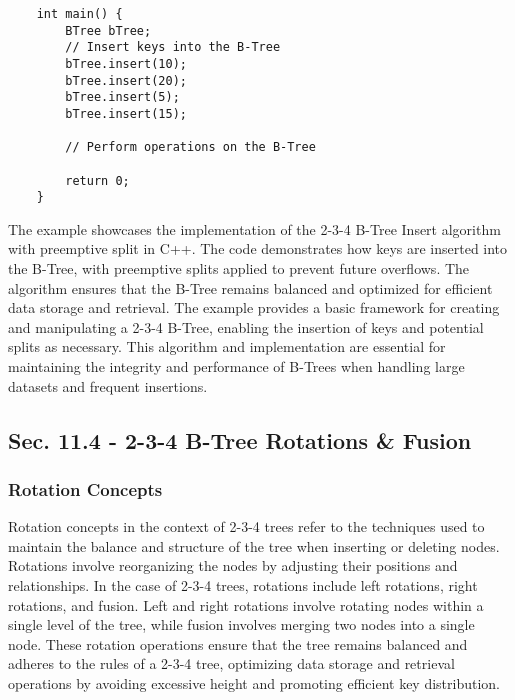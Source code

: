 \begin{solution}
\begin{verbatim}
    int main() {
        BTree bTree;
        // Insert keys into the B-Tree
        bTree.insert(10);
        bTree.insert(20);
        bTree.insert(5);
        bTree.insert(15);
        
        // Perform operations on the B-Tree
    
        return 0;
    }
    \end{verbatim}

    \horizontalline

    The example showcases the implementation of the 2-3-4 B-Tree Insert algorithm with preemptive split in C++. The code demonstrates how keys are inserted into the B-Tree, with preemptive splits applied to prevent future overflows. The algorithm ensures that the B-Tree remains balanced and optimized for efficient data storage 
    and retrieval. The example provides a basic framework for creating and manipulating a 2-3-4 B-Tree, enabling the insertion of keys and potential splits as necessary. This algorithm and implementation are essential for maintaining the integrity and performance of B-Trees when handling large datasets and frequent insertions.
\end{solution}

\subsection*{Sec. 11.4 - 2-3-4 B-Tree Rotations \& Fusion}

\subsubsection{Rotation Concepts}

Rotation concepts in the context of 2-3-4 trees refer to the techniques used to maintain the balance and structure of the tree when inserting or deleting nodes. Rotations involve reorganizing the nodes by adjusting their positions and relationships. In the case of 2-3-4 trees, rotations include left rotations, right rotations, 
and fusion. Left and right rotations involve rotating nodes within a single level of the tree, while fusion involves merging two nodes into a single node. These rotation operations ensure that the tree remains balanced and adheres to the rules of a 2-3-4 tree, optimizing data storage and retrieval operations by avoiding excessive 
height and promoting efficient key distribution.

